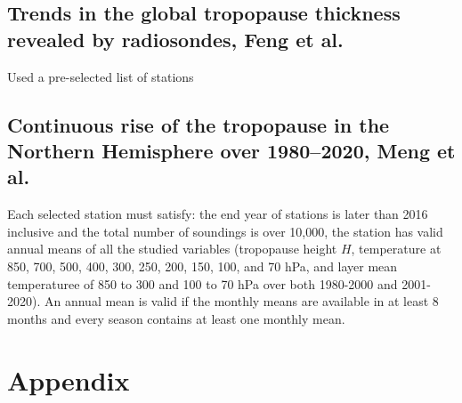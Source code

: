 \documentclass[fleqn,10pt]{wlscirep}
\begin{document}
\subsection*{Trends in the global tropopause thickness revealed by radiosondes, Feng et al. \cite{feng2012trends}}
Used a pre-selected list of stations\cite{wallis1998subset}
\subsection*{Continuous rise of the tropopause in the Northern Hemisphere over 1980–2020, Meng et al. \cite{meng2021continuous}}
Each selected station must satisfy: the end year of stations is later than 2016 inclusive and the total number of soundings is over 10,000, the station has valid annual means of all the studied variables (tropopause height $H$, temperature at 850, 700, 500, 400, 300, 250, 200, 150, 100, and 70 hPa, and layer mean temperaturee of 850 to 300 and 100 to 70 hPa over both 1980-2000 and 2001-2020). An annual mean is valid if the monthly means are available in at least 8 months and every season contains at least one monthly mean. 

\newpage 
\section*{Appendix}
\end{document}
